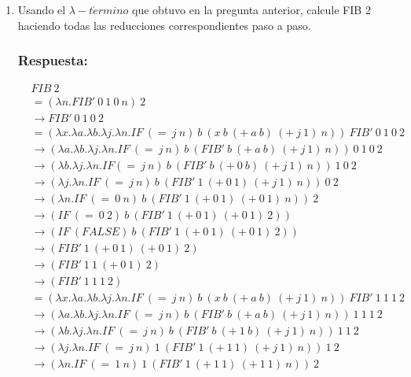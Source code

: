 \documentclass{article}
\begin{document}
\begin{enumerate}
\item Usando el $\lambda-t \acute ermino$ que obtuvo en la pregunta anterior, calcule FIB 2 haciendo todas las reducciones correspondientes paso a paso.

\subsubsection*{Respuesta:}

\begin{align*}
&FIB\ 2
\\&=(\lambda n . FIB'\ 0\ 1\ 0\ n)\ 2
\\&\rightarrow FIB'\ 0\ 1\ 0\ 2
\\&=(\lambda x . \lambda a . \lambda b . \lambda j . \lambda n . IF\ (=\ j\ n)\ b\ (x\ b\ (+\ a\ b)\ (+\ j\ 1)\ n))\ FIB'\ 0\ 1\ 0\ 2
\\&\rightarrow (\lambda a . \lambda b . \lambda j . \lambda n . IF\ (=\ j\ n)\ b\ (FIB'\ b\ (+\ a\ b)\ (+\ j\ 1)\ n))\ 0\ 1\ 0\ 2
\\&\rightarrow (\lambda b . \lambda j . \lambda n . IF (=\ j\ n)\ b\ (FIB'\ b\ (+\ 0\ b)\ (+\ j\ 1)\ n))\ 1\ 0\ 2
\\&\rightarrow (\lambda j . \lambda n . IF\ (=\ j\ n)\ b\ (FIB'\ 1\ (+\ 0\ 1)\ (+\ j\ 1)\ n))\ 0\ 2
\\&\rightarrow (\lambda n . IF\ (=\ 0\ n)\ b\ (FIB'\ 1\ (+\ 0\ 1)\ (+\ 0\ 1)\ n))\ 2
\\&\rightarrow (IF\ (=\ 0\ 2)\ b\ (FIB'\ 1\ (+\ 0\ 1)\ (+\ 0\ 1)\ 2))
\\&\rightarrow (IF\ (FALSE)\ b\ (FIB'\ 1\ (+\ 0\ 1)\ (+\ 0\ 1)\ 2))
\\&\rightarrow (FIB'\ 1\ (+\ 0\ 1)\ (+\ 0\ 1)\ 2)
\\&\rightarrow (FIB'\ 1\ 1\ (+\ 0\ 1)\ 2)
\\&\rightarrow (FIB'\ 1\ 1\ 1\ 2)
\\&=(\lambda x . \lambda a . \lambda b . \lambda j . \lambda n . IF\ (=\ j\ n)\ b\ (x\ b\ (+\ a\ b)\ (+\ j\ 1)\ n))\ FIB'\ 1\ 1\ 1\ 2
\\&\rightarrow(\lambda a . \lambda b . \lambda j . \lambda n . IF\ (=\ j\ n)\ b\ (FIB'\ b\ (+\ a\ b)\ (+\ j\ 1)\ n))\ 1\ 1\ 1\ 2
\\&\rightarrow(\lambda b . \lambda j . \lambda n . IF\ (=\ j\ n)\ b\ (FIB'\ b\ (+\ 1\ b)\ (+\ j\ 1)\ n))\ 1\ 1\ 2
\\&\rightarrow(\lambda j . \lambda n . IF\ (=\ j\ n)\ 1\ (FIB'\ 1\ (+\ 1\ 1)\ (+\ j\ 1)\ n))\ 1\ 2
\\&\rightarrow(\lambda n . IF\ (=\ 1\ n)\ 1\ (FIB'\ 1\ (+\ 1\ 1)\ (+\ 1\ 1)\ n))\ 2

\end{align*}
\end{enumerate}
\end{document}
